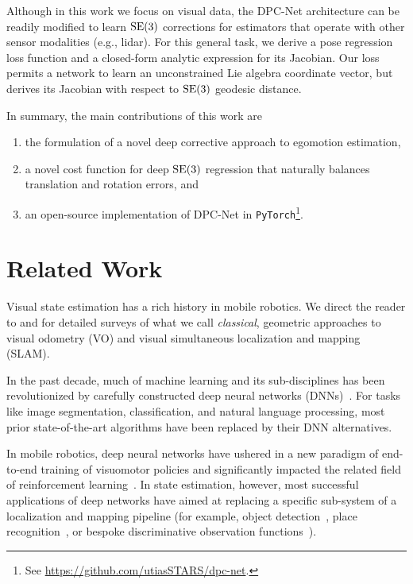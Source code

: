 Although in this work we focus on visual data, the DPC-Net architecture can be readily modified to learn $\mathrm{SE}(3)$ corrections for estimators that operate with other sensor modalities (e.g., lidar). For this general task, we derive a pose regression loss function and a closed-form analytic expression for its Jacobian. Our loss permits a network to learn an unconstrained Lie algebra coordinate vector, but derives its Jacobian with respect to $\mathrm{SE}(3)$ geodesic distance. 

In summary, the main contributions of this work are
\begin{enumerate}
	\item the formulation of a novel deep corrective approach to egomotion estimation,
	\item a novel cost function for deep $\mathrm{SE}(3)$ regression that naturally balances translation and rotation errors, and
	\item an open-source implementation of DPC-Net in \texttt{PyTorch}\footnote{See \url{https://github.com/utiasSTARS/dpc-net}.}.
	
\end{enumerate}



\section{Related Work}
Visual state estimation has a rich history in mobile robotics. We direct the reader to \cite{Scaramuzza2011-qr} and \cite{Cadena2016-ds} for detailed surveys of what we call \textit{classical}, geometric approaches to visual odometry (VO) and visual simultaneous localization and mapping (SLAM).

In the past decade, much of machine learning and its sub-disciplines has been revolutionized by carefully constructed deep neural networks (DNNs)~\cite{LeCun2015-fw}. For tasks like image segmentation, classification, and natural language processing, most prior state-of-the-art algorithms have been replaced by their DNN alternatives.

In mobile robotics, deep neural networks have ushered in a new paradigm of end-to-end training of visuomotor policies \cite{Levine2016-bj} and significantly impacted the related field of reinforcement learning~\cite{Duan2016-jw}. In state estimation, however, most successful applications of deep networks have aimed at replacing a specific sub-system of a localization and mapping pipeline (for example, object detection~\cite{yang2016exploit}, place recognition~\cite{Sunderhauf2015-oc}, or bespoke discriminative observation functions~\cite{Haarnoja2016-ph}).

